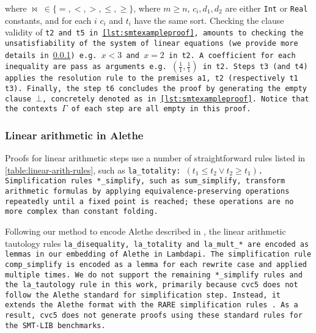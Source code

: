 where $\bowtie\;\in \{=, <, >, \leq, \geq\}$, where $m\geq n$, $c_i, d_1, d_2$ are either \lstinline[language=SMT,basicstyle=\ttfamily\footnotesize]{Int} or \lstinline[language=SMT,basicstyle=\ttfamily\footnotesize]{Real}
constants, and for each $i$ $c_i$ and $t_i$ have the same sort.
Checking the clause validity of \tt{t2} and \tt{t5} in \cref{lst:smtexampleproof}, amounts to checking the unsatisfiability of the system of linear equations (we provide more details in \cref{sssect:la-in-alethe}) e.g. $x < 3$ and $x = 2$ in \tt{t2}.
A coefficient for each inequality are pass as arguments e.g. $(\frac{1}{1},\frac{1}{1})$ in \tt{t2}.
Steps \tt{t3} (and \tt{t4}) applies the \colorbox{purple!30}{\texttt{resolution}} rule to the premises \tt{a1}, \tt{t2} (respectively \tt{t1} \tt{t3}).
Finally, the step \texttt{t6} concludes the proof by generating the empty clause $\bot$, concretely denoted as  in \cref{lst:smtexampleproof}.
Notice that the contexts \colorbox{blue!30}{$\Gamma$} of each step are all empty in this proof.

\subsubsection{Linear arithmetic in Alethe}
\label{sssect:la-in-alethe}

Proofs for linear arithmetic steps use a number of straightforward rules listed in \cref{table:linear-arith-rules}, such as \tt{la\_totality}: $(t_1 \leq t_2 \lor t_2 \geq t_1)$.
Simplification rules \tt{*\_simplify}, such as \tt{sum\_simplify}, transform arithmetic formulas by applying equivalence-preserving operations repeatedly until a fixed point is reached;
these operations are no more complex than constant folding.

Following our method to encode Alethe described in \cite{ColtellacciMD24}, the linear arithmetic tautology rules \tt{la\_disequality}, \tt{la\_totality} and \tt{la\_mult\_*} are encoded as lemmas in our embedding of Alethe in Lambdapi.
The simplification rule \tt{comp\_simplify} is encoded as a lemma for each rewrite case and applied multiple times.
We do not support the remaining \tt{*\_simplify} rules and the \tt{la\_tautology} rule in this work, primarily because cvc5 does not follow the Alethe standard for simplification step.
Instead, it extends the Alethe format with the RARE simplification rules \cite{rare}. As a result, cvc5 does not generate proofs using these standard rules for the SMT-LIB benchmarks.

